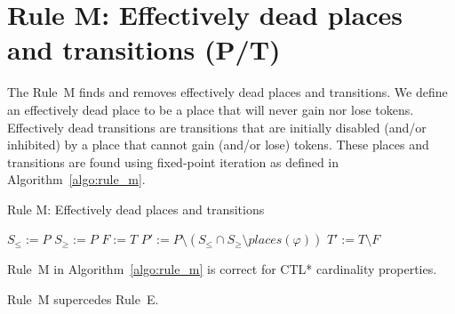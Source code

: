 \section*{Rule M: Effectively dead places and transitions (P/T)}\label{sec:rule_m}
The Rule~M finds and removes effectively dead places and transitions.
We define an effectively dead place to be a place that will never gain nor lose tokens.
Effectively dead transitions are transitions that are initially disabled (and/or inhibited)
by a place that cannot gain (and/or lose) tokens.
These places and transitions are found using fixed-point iteration as defined in Algorithm~\ref{algo:rule_m}.

\begin{algorithm}
    \vspace{0.2cm}
    \caption{Rule M: Effectively dead places and transitions}
    \label{algo:rule_m}
    \DontPrintSemicolon
    \LinesNumbered
    \vspace{1mm}
    $S_\leq:=P$
    $S_\geq:=P$
    $F:=T$
    $P':=P\setminus(S_\leq\cap S_\geq\setminus places(\varphi))$\;
    $T':=T\setminus F$\;
    \vspace{0.2cm}
\end{algorithm}

\begin{theorem}\label{theorem:rule_m}
    Rule~M in Algorithm~\ref{algo:rule_m} is correct for CTL* cardinality properties.
\end{theorem}
\begin{theorem}\label{theorem:rule_m_supercedes_e}
Rule~M supercedes Rule~E.
\end{theorem}
